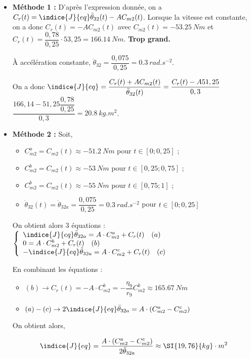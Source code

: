 \ifprof
\begin{corrige}
\begin{itemize}
\item \textbf{Méthode 1 : }
D'après l'expression donnée, on a $C_r(t)=\indice{J}{eq}\ddot{\theta}_{32}(t)-A C_{m2}(t)$.
Lorsque la vitesse est constante, on a donc $C_r(t)=-A C_{m2}(t)$ avec $C_{m2}(t)=-\SI{53,25}{Nm}$ et 
$C_r(t)= \dfrac{0,78}{0,25} \cdot  53,25  = \SI{166,14}{Nm}$.   \textbf{Trop grand.}


À accélération constante, $\ddot{\theta}_{32} = \dfrac{0,075}{0,25}=\SI{0,3}{rad.s^{-2}}$. 

On a donc 
$\indice{J}{eq}=\dfrac{C_r(t)+A C_{m2}(t)}{\ddot{\theta}_{32}(t)}=\dfrac{C_r(t)-A 51,25}{0,3}$ 
$\dfrac{166,14  -51,25\dfrac{0,78}{0,25}}{0,3}=\SI{20,8}{kg.m^2}$. 

\item \textbf{Méthode 2 : }
Soit,
\begin{itemize}
\item $C^{a}_{m2}=C_{m2}(t)\approx-\SI{51,2}{Nm}$ pour $t\in\left[0;0,25\right]$ ;
\item $C^{b}_{m2}=C_{m2}(t)\approx-\SI{53}{Nm}$ pour $t\in\left[0,25;0,75\right]$ ;
\item $C^{b}_{m2}=C_{m2}(t)\approx-\SI{55}{Nm}$ pour $t\in\left[0,75;1\right]$ ;
\item $\ddot{\theta}_{32}(t)=\ddot{\theta}_{32a}=\dfrac{0,075}{0,25}=\SI{0,3}{rad. s^{-2}}$ pour $t\in \left[0;0,25\right]$
\end{itemize}

On obtient alors 3 équations : 
$
\left\{
\begin{array}{l}
\indice{J}{eq}\ddot{\theta}_{32a}=A\cdot C^{a}_{m2}+C_r(t) \quad (a)\\
0=A\cdot C^{b}_{m2}+C_r(t)  \quad (b)\\
-\indice{J}{eq}\ddot{\theta}_{32a}=A\cdot C^{c}_{m2}+C_r(t)  \quad (c)\\
\end{array}
\right.
$

En combinant les équations : 
\begin{itemize}
\item $(b) \rightarrow C_r(t)=-A\cdot  C^{b}_{m2}=-\dfrac{\eta_9}{r_9}C^{b}_{m2}\approx \SI{165,67}{Nm}$
\item $(a)-(c)\rightarrow 2 \indice{J}{eq} \ddot{\theta}_{32a}=A\cdot \left(C^{a}_{m2}-C^{c}_{m2}\right)$
\end{itemize}

On obtient alors,

\begin{align*}
\indice{J}{eq}=\dfrac{A\cdot \left(C^{a}_{m2}-C^{c}_{m2}\right)}{2\ddot{\theta}_{32a}} \approx \SI{19,76}{kg}\cdot m^2
\end{align*}
\end{itemize}
\end{corrige}
\else
\fi


